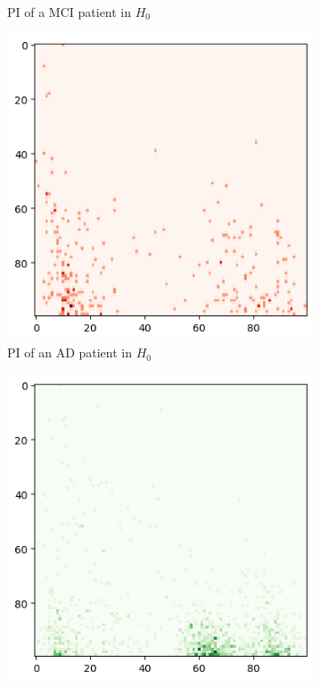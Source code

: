 \documentclass{article}
\begin{document}
\begin{figure}[htb]
\begin{subfigure}{0.32\textwidth}
    \caption{PI of a MCI patient in $H_0$}
  \end{subfigure}
  \begin{subfigure}{0.32\textwidth}
    \includegraphics[width=\textwidth]{figures/representative_samples/Persistence_image_AD_h_0.png}
    \caption{PI of an AD patient in $H_0$}
  \end{subfigure}
  \begin{subfigure}{0.32\textwidth}
    \includegraphics[width=\textwidth]{figures/representative_samples/Persistence_image_CN_h_1.png}

\end{subfigure}
\end{figure}
\end{document}
